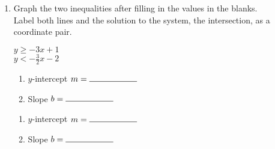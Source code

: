 \documentclass[12pt, twoside]{article}
\begin{document}
\begin{enumerate}
\begin{enumerate}
\begin{multicols}{2}
          Line: \hspace{1cm} Solid ($=$) \hspace{0.45cm} Dashed ($\neq$)\\[0.5cm]
          Shading: \hspace{0.3cm} Above ($y>$) \hspace{0.25cm} Below ($y<$)
        \end{multicols}

    \newpage
    \item Graph the two inequalities after filling in the values in the blanks.\\[0.5cm]
    Label both lines and the solution to the system, the intersection, as a coordinate pair.\\

    \begin{multicols}{2}
      $y \geq -3 x +1$ \\
      $y < -\frac{3}{2} x -2$
    \end{multicols}
    \begin{multicols}{2}
      \raggedcolumns
      \begin{enumerate}
        \item $y$-intercept $m= \rule{2cm}{0.15mm}$ \\[0.5cm]
        \item Slope \hspace{0.7cm} $b= \rule{2cm}{0.15mm}$\\[0.5cm]
      \end{enumerate}
      \begin{enumerate}
        \item $y$-intercept $m= \rule{2cm}{0.15mm}$ \\[0.5cm]
        \item Slope \hspace{0.7cm} $b= \rule{2cm}{0.15mm}$\\[0.5cm]
      \end{enumerate}
    \end{multicols}

    \begin{center} %
    \end{center}


\end{enumerate}
\end{enumerate}
\end{document}
